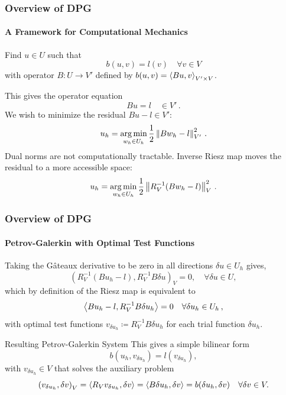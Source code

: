 \documentclass[18pt,xcolor=table]{beamer}
\begin{document}
\begin{frame}[t]
\frametitle{Overview of DPG}
\framesubtitle{A Framework for Computational Mechanics}
Find $u\in U$ such that
\[
b(u,v)=l(v)\quad\forall v\in V
\]
with operator $B:U\rightarrow V'$ defined by $b(u,v)=\left\langle Bu,v \right\rangle_{V'\times V}$.

This gives the operator equation 
\[
Bu=l\quad\in V'\,.
\]
We wish to minimize the residual $Bu-l\in V'$:
\[
u_h=\operatorname*{arg\,min}_{w_h\in U_h}\frac{1}{2}\left\| Bw_h-l \right\|^2_{V'}\,.
\]
Dual norms are not computationally tractable. 
Inverse Riesz map moves the residual to a more accessible space:
\[
u_h=\operatorname*{arg\,min}_{w_h\in U_h}\frac{1}{2}\left\| R_V^{-1}(Bw_h-l) \right\|^2_{V}\,.
\]
\end{frame}


\begin{frame}[t]
\frametitle{Overview of DPG}
\framesubtitle{Petrov-Galerkin with Optimal Test Functions}
Taking the G\^ateaux derivative to be zero in all directions $\delta u \in
U_h$ gives,
\[
\left(R_V^{-1}(Bu_h-l),R_V^{-1}B\delta u\right)_V = 0, \quad \forall \delta u \in U,
\]
which by definition of the Riesz map is equivalent to 
\begin{equation*}
\left\langle Bu_h-l,R_V^{-1}B\delta u_h \right\rangle=0\quad\forall\delta u_h\in U_h\,,
\end{equation*}
with optimal test functions $v_{\delta u_h}\coloneqq R_V^{-1}B\delta u_h$ for each trial function $\delta u_h$.
\begin{block}{Resulting Petrov-Galerkin System}
This gives a simple bilinear form
\begin{equation*}
b(u_h,v_{\delta u_h})=l(v_{\delta u_h}),
\end{equation*}
with $v_{\delta u_h}\in V$ that solves the auxiliary problem
\begin{equation*}
\left( v_{\delta u_h},\delta v \right)_V=\left\langle R_Vv_{\delta u_h},\delta v \right\rangle
=\left\langle B\delta u_h,\delta v \right\rangle=b(\delta u_h,\delta v)\quad\forall\delta v\in V.
\end{equation*}
\end{block}
\end{frame}
\end{document}
